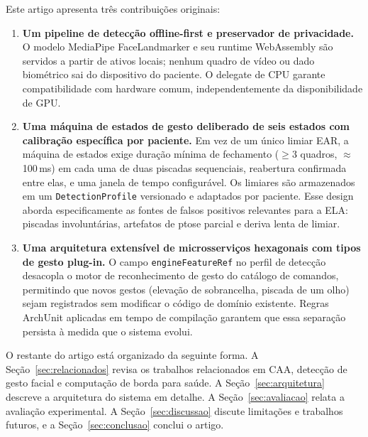 Este artigo apresenta três contribuições originais:
\begin{enumerate}
  \item \textbf{Um pipeline de detecção offline-first e preservador de privacidade.}
    O modelo MediaPipe FaceLandmarker e seu runtime WebAssembly são servidos a partir
    de ativos locais; nenhum quadro de vídeo ou dado biométrico sai do dispositivo
    do paciente. O delegate de CPU garante compatibilidade com hardware comum,
    independentemente da disponibilidade de GPU.

  \item \textbf{Uma máquina de estados de gesto deliberado de seis estados com
    calibração específica por paciente.}
    Em vez de um único limiar EAR, a máquina de estados exige duração mínima de
    fechamento ($\geq$3 quadros, ${\approx}$100\,ms) em cada uma de duas piscadas
    sequenciais, reabertura confirmada entre elas, e uma janela de tempo configurável.
    Os limiares são armazenados em um \texttt{DetectionProfile} versionado e adaptados
    por paciente. Esse design aborda especificamente as fontes de falsos positivos
    relevantes para a ELA: piscadas involuntárias, artefatos de ptose parcial e
    deriva lenta de limiar.

  \item \textbf{Uma arquitetura extensível de microsserviços hexagonais com tipos de
    gesto plug-in.}
    O campo \texttt{engineFeatureRef} no perfil de detecção desacopla o motor de
    reconhecimento de gesto do catálogo de comandos, permitindo que novos gestos
    (elevação de sobrancelha, piscada de um olho) sejam registrados sem modificar o
    código de domínio existente. Regras ArchUnit aplicadas em tempo de compilação
    garantem que essa separação persista à medida que o sistema evolui.
\end{enumerate}

O restante do artigo está organizado da seguinte forma. A Seção~\ref{sec:relacionados}
revisa os trabalhos relacionados em CAA, detecção de gesto facial e computação de
borda para saúde. A Seção~\ref{sec:arquitetura} descreve a arquitetura do sistema em
detalhe. A Seção~\ref{sec:avaliacao} relata a avaliação experimental. A
Seção~\ref{sec:discussao} discute limitações e trabalhos futuros, e a
Seção~\ref{sec:conclusao} conclui o artigo.
